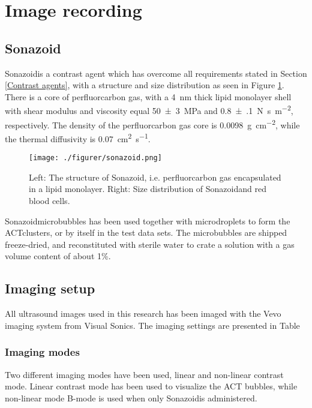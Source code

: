 \section{Image recording}
\subsection{Sonazoid\texttrademark}
Sonazoid\texttrademark is a contrast agent which has overcome all requirements stated in Section \ref{Contrast agents}, with a structure and size distribution as seen in Figure \ref{Fig:Sonazoid}. There is a core of perfluorcarbon gas, with a \SI{4}{\nano\meter} thick lipid monolayer shell with shear modulus and viscosity equal \SI{50(3)}{\mega\pascal} and \SI{0.8(1)}{\newton\second\per\meter\squared}, respectively\cite{Hoff2000}. The density of the perfluorcarbon gas core is \SI{0.0098}{\gram\per\centi\meter\squared}, while the thermal diffusivity is \SI{0.07}{\centi\meter\squared\per\second}\cite{Healey2012}. 

\begin{figure}[h]
  \centering
  \label{Fig:Sonazoid}
  \texttt{[image: ./figurer/sonazoid.png]}
  \caption{Left: The structure of Sonazoid\texttrademark , i.e. perfluorcarbon gas encapsulated in a lipid monolayer. Right: Size distribution of Sonazoid\texttrademark and red blood cells\cite{Healey2012}.}
\end{figure}

Sonazoid\texttrademark microbubbles has been used together with microdroplets to form the ACT\texttrademark clusters, or by itself in the test data sets. The microbubbles are shipped freeze-dried, and reconstituted with sterile water to crate a solution with a gas volume content of about 1\%. %

\subsection{Imaging setup}
All ultrasound images used in this research has been imaged with the Vevo imaging system from Visual Sonics. The imaging settings are presented in Table

\subsubsection{Imaging modes}
Two different imaging modes have been used, linear and non-linear contrast mode. Linear contrast mode has been used to visualize the ACT bubbles, while non-linear mode B-mode is used when only Sonazoid\texttrademark is administered. 

